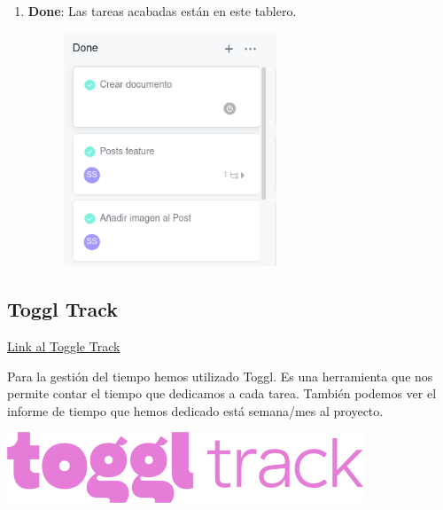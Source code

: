 \documentclass[12pt,a4paper]{article}
\begin{document}
\begin{enumerate}
\clearpage

\item \textbf{Done}: Las tareas acabadas están en este tablero.

\begin{figure}[h]
	\centering
	\includegraphics[width=0.6\textwidth]{done}
\end{figure}


\end{enumerate}


\clearpage

\subsection{Toggl Track}
\href{https://track.toggl.com/5287323/projects/168929071/team}{Link al Toggle Track}\\


\begin{minipage}{.75\textwidth}
Para la gestión del tiempo hemos utilizado Toggl. Es una herramienta que nos permite contar el tiempo que dedicamos a cada tarea.
También podemos ver el informe de tiempo que hemos dedicado está semana/mes al proyecto. \\

\end{minipage} %
\begin{minipage}{.25\textwidth}
  \includegraphics[width=0.8\textwidth, right]{toggl}
\end{minipage}
\end{document}
